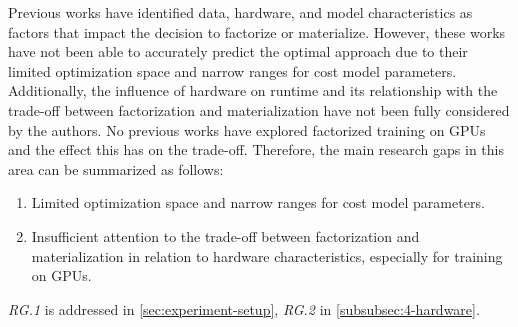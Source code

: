 Previous works have identified data, hardware, and model characteristics as factors that impact the decision to factorize or materialize. However, these works have not been able to accurately predict the optimal approach due to their limited optimization space and narrow ranges for cost model parameters. Additionally, the influence of hardware on runtime and its relationship with the trade-off between factorization and materialization have not been fully considered by the authors. No previous works have explored factorized training on GPUs and the effect this has on the trade-off. Therefore, the main research gaps in this area can be summarized as follows:
\begin{enumerate}[leftmargin=1.5cm, label=\emph{RG.\arabic*}]
    \item Limited optimization space and narrow ranges for cost model parameters.
    \item Insufficient attention to the trade-off between factorization and materialization in relation to hardware characteristics, especially for training on GPUs.
\end{enumerate}
\emph{RG.1} is addressed in \autoref{sec:experiment-setup}, \emph{RG.2} in \autoref{subsubsec:4-hardware}.
